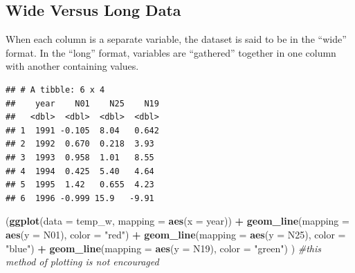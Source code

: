 \documentclass[12pt,]{article}
\newenvironment{Shaded}{\begin{snugshade}}{\end{snugshade}}
\newcommand{\KeywordTok}[1]{\textcolor[rgb]{0.13,0.29,0.53}{\textbf{#1}}}
\newcommand{\DataTypeTok}[1]{\textcolor[rgb]{0.13,0.29,0.53}{#1}}
\newcommand{\DecValTok}[1]{\textcolor[rgb]{0.00,0.00,0.81}{#1}}
\newcommand{\StringTok}[1]{\textcolor[rgb]{0.31,0.60,0.02}{#1}}
\newcommand{\CommentTok}[1]{\textcolor[rgb]{0.56,0.35,0.01}{\textit{#1}}}
\newcommand{\OperatorTok}[1]{\textcolor[rgb]{0.81,0.36,0.00}{\textbf{#1}}}
\newcommand{\NormalTok}[1]{#1}
\begin{document}
\subsection{Wide Versus Long Data}\label{wide-versus-long-data}

When each column is a separate variable, the dataset is said to be in
the ``wide'' format. In the ``long'' format, variables are ``gathered''
together in one column with another containing values.

\begin{Shaded}
\end{Shaded}

\begin{verbatim}
## # A tibble: 6 x 4
##    year    N01    N25    N19
##   <dbl>  <dbl>  <dbl>  <dbl>
## 1  1991 -0.105  8.04   0.642
## 2  1992  0.670  0.218  3.93 
## 3  1993  0.958  1.01   8.55 
## 4  1994  0.425  5.40   4.64 
## 5  1995  1.42   0.655  4.23 
## 6  1996 -0.999 15.9   -9.91
\end{verbatim}

\begin{Shaded}
\begin{Highlighting}[]
\NormalTok{(}\KeywordTok{ggplot}\NormalTok{(}\DataTypeTok{data =}\NormalTok{ temp_w,}
        \DataTypeTok{mapping =} \KeywordTok{aes}\NormalTok{(}\DataTypeTok{x =}\NormalTok{ year)) }\OperatorTok{+}\StringTok{ }
\StringTok{    }\KeywordTok{geom_line}\NormalTok{(}\DataTypeTok{mapping =} \KeywordTok{aes}\NormalTok{(}\DataTypeTok{y =}\NormalTok{ N01), }\DataTypeTok{color =} \StringTok{"red"}\NormalTok{) }\OperatorTok{+}
\StringTok{    }\KeywordTok{geom_line}\NormalTok{(}\DataTypeTok{mapping =} \KeywordTok{aes}\NormalTok{(}\DataTypeTok{y =}\NormalTok{ N25), }\DataTypeTok{color =} \StringTok{"blue"}\NormalTok{) }\OperatorTok{+}
\StringTok{    }\KeywordTok{geom_line}\NormalTok{(}\DataTypeTok{mapping =} \KeywordTok{aes}\NormalTok{(}\DataTypeTok{y =}\NormalTok{ N19), }\DataTypeTok{color =} \StringTok{"green"}\NormalTok{)}
\NormalTok{  ) }\CommentTok{#this method of plotting is not encouraged}
\end{Highlighting}
\end{Shaded}
\end{document}
